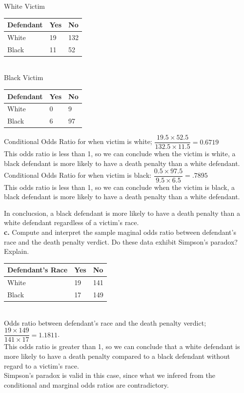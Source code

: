 \documentclass[paper=letter, fontsize=11pt]{scrartcl} %
\begin{document}
White Victim\\
\begin{tabular}{|l|l|l|}
\hline
Defendant & Yes & No  \\ \hline
White     & 19  & 132 \\ \hline
Black     & 11  & 52  \\ \hline
\end{tabular}
\\

Black Victim\\ 
\begin{tabular}{|l|l|l|}
\hline
Defendant & Yes & No \\ \hline
White     & 0   & 9  \\ \hline
Black     & 6   & 97 \\ \hline
\end{tabular}

Conditional Odds Ratio for when victim is white; $\dfrac{19.5 \times 52.5}{132.5 \times
11.5} = 0.6719$ \\
This odds ratio is less than 1, so we can conclude when the victim is white, a black defendant
is more likely to have a death penalty than a white defendant. \\

Conditional Odds Ratio for when victim is black: $\dfrac{0.5 \times 97.5}{9.5 \times 6.5}
= .7895$\\
This odds ratio is less than 1, so we can conclude when the victim is black, a black defendant
is more likely to have a death penalty than a white defendant.

In conclucsion, a black defendant is more likely to have a death penalty than a white
defendant regardless of a victim's race. \\

\textbf{c.} Compute and interpret the sample maginal odds ratio between defendant's race
and the death penalty verdict. Do these data exhibit Simpson's paradox? Explain. \\

\begin{tabular}{|l|l|l|}
\hline
Defendant's Race & Yes & No  \\ \hline
White            & 19  & 141 \\ \hline
Black            & 17  & 149 \\ \hline
\end{tabular}
\\
Odds ratio between defendant's race and the death penalty verdict; $\dfrac{19 \times 149}
{141 \times 17} = 1.1811$. \\
This odds ratio is greater than 1, so we can conclude that a white defendant is more likely
to have a death penalty compared to a black defendant without regard to a victim's race. \\
Simpson's paradox is valid in this case, since what we infered from the conditional and marginal odds ratios are contradictory. \\
\end{document}
